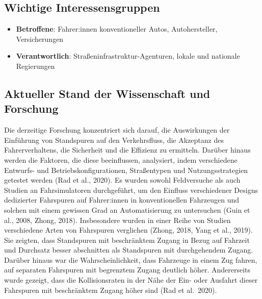 \documentclass[
]{book}
\providecommand{\tightlist}{%
  \setlength{\itemsep}{0pt}\setlength{\parskip}{0pt}}
\begin{document}
\hypertarget{wichtige-interessensgruppen}{%
\subsection*{Wichtige Interessensgruppen}\label{wichtige-interessensgruppen}}

\begin{itemize}
\tightlist
\item
  \textbf{Betroffene}: Fahrer:innen konventioneller Autos, Autohersteller, Versicherungen
\item
  \textbf{Verantwortlich}: Straßeninfrastruktur-Agenturen, lokale und nationale Regierungen
\end{itemize}

\hypertarget{aktueller-stand-der-wissenschaft-und-forschung}{%
\subsection*{Aktueller Stand der Wissenschaft und Forschung}\label{aktueller-stand-der-wissenschaft-und-forschung}}

Die derzeitige Forschung konzentriert sich darauf, die Auswirkungen der Einführung von Standspuren auf den Verkehrsfluss, die Akzeptanz des Fahrerverhaltens, die Sicherheit und die Effizienz zu ermitteln. Darüber hinaus werden die Faktoren, die diese beeinflussen, analysiert, indem verschiedene Entwurfs- und Betriebskonfigurationen, Straßentypen und Nutzungsstrategien getestet werden (Rad et al., 2020). Es wurden sowohl Feldversuche als auch Studien an Fahrsimulatoren durchgeführt, um den Einfluss verschiedener Designs dedizierter Fahrspuren auf Fahrer:innen in konventionellen Fahrzeugen und solchen mit einem gewissen Grad an Automatisierung zu untersuchen (Guin et al., 2008, Zhong, 2018). Insbesondere wurden in einer Reihe von Studien verschiedene Arten von Fahrspuren verglichen (Zhong, 2018, Yang et al., 2019). Sie zeigten, dass Standspuren mit beschränktem Zugang in Bezug auf Fahrzeit und Durchsatz besser abschnitten als Standspuren mit durchgehendem Zugang. Darüber hinaus war die Wahrscheinlichkeit, dass Fahrzeuge in einem Zug fahren, auf separaten Fahrspuren mit begrenztem Zugang deutlich höher. Andererseits wurde gezeigt, dass die Kollisionsraten in der Nähe der Ein- oder Ausfahrt dieser Fahrspuren mit beschränktem Zugang höher sind (Rad et al.~2020).
\end{document}
